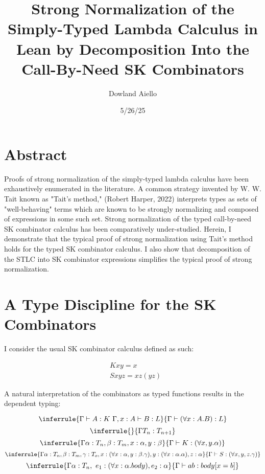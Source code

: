 \documentclass[11pt]{article}
\author{Dowland Aiello}
\date{5/26/25}
\title{Strong Normalization of the Simply-Typed Lambda Calculus in Lean by Decomposition Into the Call-By-Need SK Combinators}
\begin{document}
\maketitle
\tableofcontents

\section{Abstract}
\label{sec:org080e55c}

Proofs of strong normalization of the simply-typed lambda calculus have been exhaustively enumerated in the literature. A common strategy invented by W. W. Tait known as "Tait's method," (Robert Harper, 2022) interprets types as sets of "well-behaving" terms which are known to be strongly normalizing and composed of expressions in some such set.
Strong normalization of the typed call-by-need SK combinator calculus has been comparatively under-studied. Herein, I demonstrate that the typical proof of strong normalization using Tait's method holds for the typed SK combinator calculus. I also show that decomposition of the STLC into SK combinator expressions simplifies the typical proof of strong normalization.
\section{A Type Discipline for the SK Combinators}
\label{sec:orgd562184}

I consider the usual SK combinator calculus defined as such:

\begin{align}
& K xy = x \\
& S xyz = xz (yz)
\end{align}

A natural interpretation of the combinators as typed functions results in the dependent typing:

\label{inference:1}

\[
\inferrule
  { \Gamma \vdash A : K \ \Gamma,x : A \vdash B : L }
  { \Gamma \vdash (\forall x : A.B) : L}
\]
\[
\inferrule
  { }
  { \Gamma T_{n} : T_{n + 1} }
\]
\[
\inferrule
  { \Gamma \alpha : T_{n}, \beta : T_{m}, x : \alpha, y : \beta }
  { \Gamma \vdash K : (\forall x, y.\alpha) }
\]
\[
\inferrule
  { \Gamma \alpha : T_{n}, \beta : T_{m}, \gamma : T_{o}, x : (\forall x : \alpha, y : \beta.\gamma), y : (\forall x : \alpha.\alpha), z : \alpha }
  { \Gamma \vdash S : (\forall x, y, z.\gamma) }
\]
\[
\inferrule
  { \Gamma \alpha : T_{n},\ e_{1} : (\forall x : \alpha.body), e_{2} : \alpha }
  { \Gamma \vdash a b : body[x = b] }
\]
\end{document}
